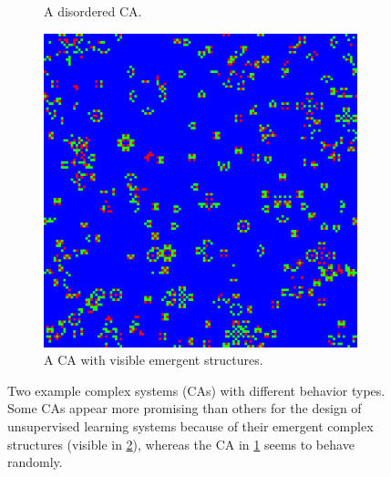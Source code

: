 \begin{enumerate}
\begin{figure}[htbp]
\begin{subfigure}[b]{.4\linewidth}
  \caption{A disordered \acl{CA}.}
 \label{fig:disordered_sys}
\end{subfigure}
\hspace{30pt}
\begin{subfigure}[b]{.4\linewidth}
  \centering
  \includegraphics[width=\linewidth]{figures/micro4.png}
  \caption{A \acl{CA} with visible emergent structures.}
  \label{fig:structured_sys}
\end{subfigure}
\caption{Two example complex systems (\aclp{CA}) with different behavior types. Some
  \aclp{CA} appear more promising than others for the design of unsupervised
  learning systems because of their emergent complex structures (visible in
  \ref{fig:structured_sys}), whereas the \ac{CA} in \ref{fig:disordered_sys}
  seems to behave randomly.}
  \label{fig:comparison_ca}
\end{figure}


\end{enumerate}
